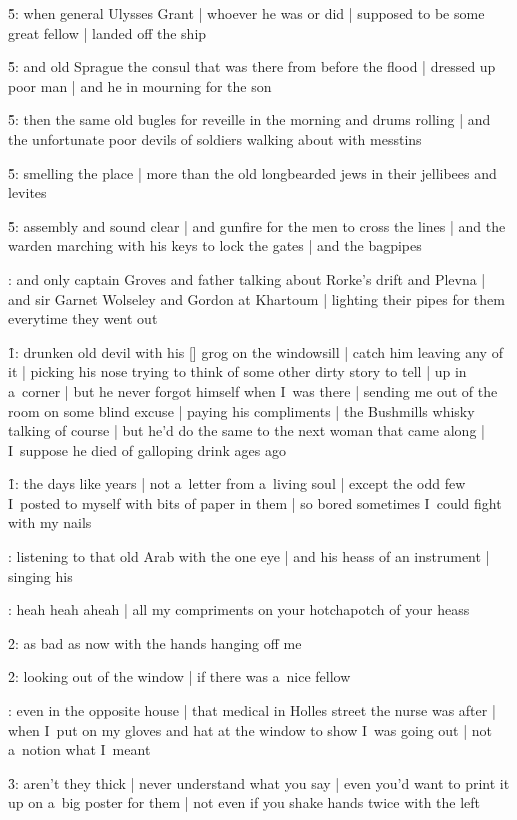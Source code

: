 \f5:
when general Ulysses Grant |
whoever he was or did |
supposed to be some great fellow |
landed off the ship

\f5:
and old Sprague the consul that was there from before the flood |
dressed up poor man |
and he in mourning for the son

\f5:
then the same old bugles for reveille in the morning and drums rolling |
and the unfortunate poor devils of soldiers walking about with messtins

\f5:
smelling the place |
more than the old longbearded jews in their jellibees and levites

\f5:
assembly and sound clear |
and gunfire for the men to cross the lines |
and the warden marching with his keys to lock the gates |
and the bagpipes

:
and only captain Groves and father talking about Rorke's drift and Plevna |
and sir Garnet Wolseley and Gordon at Khartoum |
lighting their pipes for them everytime they went out

\f1:
drunken old devil with his [\groves] grog on the windowsill |
catch him leaving any of it |
picking his nose trying to think of some other dirty story to tell |
up in a~corner |
but he never forgot himself when I~was there |
sending me out of the room on some blind excuse |
paying his compliments |
the Bushmills whisky talking of course |
but he'd do the same to the next woman that came along |
I~suppose he died of galloping drink ages ago

\f1:
the days like years |
not a~letter from a~living soul |
except the odd few I~posted to myself with bits of paper in them |
so bored sometimes I~could fight with my nails

:
listening to that old Arab with the one eye |
and his heass of an instrument |
singing his

:
heah heah aheah |
all my compriments on your hotchapotch of your heass

\f2:
as bad as now with the hands hanging off me

\f2:
looking out of the window |
if there was a~nice fellow

:
even in the opposite house |
that medical in Holles street the nurse was after |
when I~put on my gloves and hat at the window to show I~was going out |
not a~notion what I~meant

\f3:
aren't they thick |
never understand what you say |
even you'd want to print it up on a~big poster for them |
not even if you shake hands twice with the left

